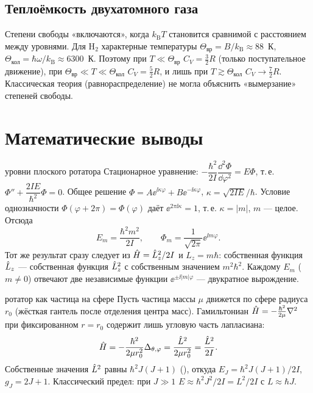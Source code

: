 \subsection{Теплоёмкость двухатомного газа}

Степени свободы «включаются», когда $k_{\mathrm B}T$ становится сравнимой с расстоянием между уровнями. Для H$_2$
характерные температуры $\Theta_{\text{вр}}=B/k_{\mathrm B}\approx88$~К, $\Theta_{\text{кол}}=\hbar\omega/k_{\mathrm B}\approx6300$~К.
Поэтому при $T\ll\Theta_{\text{вр}}$ $C_V=\frac32R$ (только поступательное движение), при
$\Theta_{\text{вр}}\ll T\ll\Theta_{\text{кол}}$ $C_V=\frac52R$, и лишь при $T\gtrsim\Theta_{\text{кол}}$ $C_V\to\frac72R$.
Классическая теория (равнораспределение) не могла объяснить «вымерзание» степеней свободы.

\section{Математические выводы}

\begin{derivation}[label=der:11:plane]{уровни плоского ротатора}
Стационарное уравнение: $-\dfrac{\hbar^2}{2I}\dfrac{\dd^2\Phi}{\dd\varphi^2}=E\Phi$, т.\,е. $\Phi''+\dfrac{2IE}{\hbar^2}\Phi=0$.
Общее решение $\Phi=A\ee^{\ii\kappa\varphi}+B\ee^{-\ii\kappa\varphi}$, $\kappa=\sqrt{2IE}/\hbar$. Условие однозначности
$\Phi(\varphi+2\pi)=\Phi(\varphi)$ даёт $\ee^{2\pi\ii\kappa}=1$, т.\,е. $\kappa=|m|$, $m$ — целое. Отсюда
\[
  E_m=\frac{\hbar^2m^2}{2I},\qquad \Phi_m=\frac{1}{\sqrt{2\pi}}\ee^{\ii m\varphi}.
\]
Тот же результат сразу следует из $\hat{H}=\hat{L}_z^2/2I$ и $L_z=m\hbar$: собственная функция $\hat{L}_z$ — собственная
функция $\hat{L}_z^2$ с собственным значением $m^2\hbar^2$. Каждому $E_m$ ($m\neq0$) отвечают две независимые функции
$\ee^{\pm\ii|m|\varphi}$ — двукратное вырождение.
\end{derivation}

\begin{derivation}[label=der:11:rigid]{ротатор как частица на сфере}
Пусть частица массы $\mu$ движется по сфере радиуса $r_0$ (жёсткая гантель после отделения центра масс).
Гамильтониан $\hat{H}=-\frac{\hbar^2}{2\mu}\nabla^2$ при фиксированном $r=r_0$ содержит лишь угловую часть лапласиана:
\[
  \hat{H}=-\frac{\hbar^2}{2\mu r_0^2}\Delta_{\theta,\varphi}=\frac{\hat{L}^2}{2\mu r_0^2}=\frac{\hat{L}^2}{2I}.
\]
Собственные значения $\hat{L}^2$ равны $\hbar^2J(J+1)$ (), откуда $E_J=\hbar^2J(J+1)/2I$, $g_J=2J+1$.
Классический предел: при $J\gg1$ $E\approx\hbar^2J^2/2I=L^2/2I$ с $L\approx\hbar J$.
\end{derivation}

